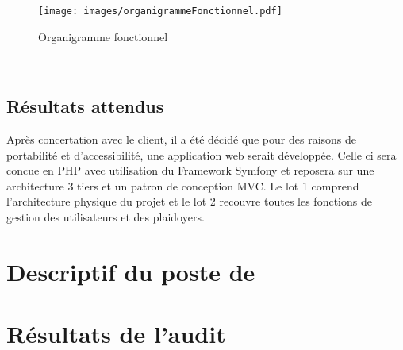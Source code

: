 \documentclass[asi]{picInsa}
\begin{document}
\begin{figure}[H]
	\texttt{[image: images/organigrammeFonctionnel.pdf]}
	\caption{Organigramme fonctionnel}
	\label{organigramme}
\end{figure}
~\\


\section{Résultats attendus}
Après concertation avec le client, il a été décidé que pour des raisons de portabilité et d'accessibilité, une application web serait développée. Celle ci sera concue en PHP avec utilisation du Framework Symfony et reposera sur une architecture 3 tiers et un patron de conception MVC. Le lot 1 comprend l'architecture physique du projet et le lot 2 recouvre toutes les fonctions de gestion des utilisateurs et des plaidoyers.




\chapter{Descriptif du poste de \RQ}
\label{Descriptif}

\chapter{Résultats de l'audit}
\label{Resultats}

 
\begin{appendix}
\listoffigures
{}
	 
\listoftables
{}
\end{appendix}
\pageQuatriemeCouverture
\end{document}
